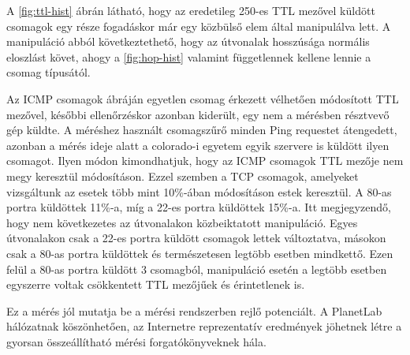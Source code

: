 A \ref{fig:ttl-hist} ábrán látható, hogy az eredetileg 250-es TTL mezővel küldött csomagok egy része fogadáskor már egy közbülső elem által manipulálva lett. A manipuláció abból következtethető, hogy az útvonalak hosszúsága normális eloszlást követ, ahogy a \ref{fig:hop-hist} valamint függetlennek kellene lennie a csomag típusától.

Az ICMP csomagok ábráján egyetlen csomag érkezett vélhetően módosított TTL mezővel, későbbi ellenőrzéskor azonban kiderült, egy nem a mérésben résztvevő gép küldte. A méréshez használt csomagszűrő minden Ping requestet átengedett, azonban a mérés ideje alatt a colorado-i egyetem egyik szervere is küldött ilyen csomagot. Ilyen módon kimondhatjuk, hogy az ICMP csomagok TTL mezője nem megy keresztül módosításon. Ezzel szemben a TCP csomagok, amelyeket vizsgáltunk az esetek több mint 10\%-ában módosításon estek keresztül. A 80-as portra küldöttek 11\%-a, míg a 22-es portra küldöttek 15\%-a. Itt megjegyzendő, hogy nem következetes az útvonalakon közbeiktatott manipuláció. Egyes útvonalakon csak a 22-es portra küldött csomagok lettek változtatva, másokon csak a 80-as portra küldöttek és természetesen legtöbb esetben mindkettő. Ezen felül a 80-as portra küldött 3 csomagból, manipuláció esetén a legtöbb esetben egyszerre voltak csökkentett TTL mezőjűek és érintetlenek is.

Ez a mérés jól mutatja be a mérési rendszerben rejlő potenciált. A PlanetLab hálózatnak köszönhetően, az Internetre reprezentatív eredmények jöhetnek létre a gyorsan összeállítható mérési forgatókönyveknek hála.
